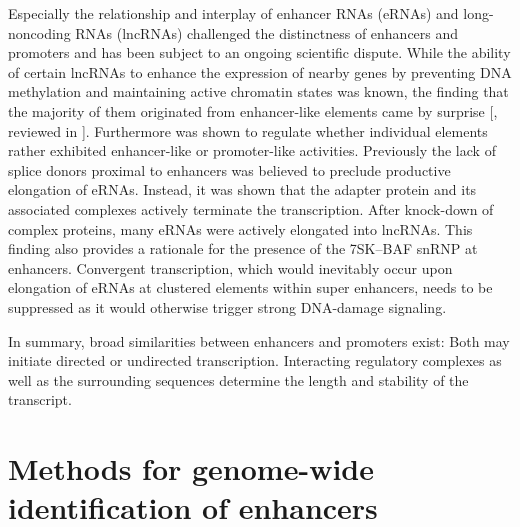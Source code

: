 Especially the relationship and interplay of enhancer RNAs (eRNAs) and long-noncoding RNAs (lncRNAs) challenged the distinctness of enhancers and promoters and has been subject to an ongoing scientific dispute\cite{Kowalczyk2012}. While the ability of certain lncRNAs to enhance the expression of nearby genes\cite{Oerom2010} by preventing DNA methylation\cite{DiRuscio2013} and maintaining active chromatin states\cite{Yang2014} was known, the finding that the majority of them originated from enhancer-like elements came by surprise [, reviewed in ]. Furthermore  was shown to regulate whether individual elements rather exhibited enhancer-like or promoter-like activities\cite{Outchkourov2013}. Previously the lack of splice donors\cite{Fong2001} proximal to enhancers was believed to preclude productive elongation of eRNAs\cite{Core2014}. Instead, it was shown that the adapter protein  and its associated complexes actively terminate the transcription. After knock-down of complex proteins, many eRNAs were actively elongated into lncRNAs\cite{Austenaa2015}. This finding also provides a rationale for the presence of the 7SK–BAF snRNP at enhancers. Convergent transcription, which would inevitably occur upon elongation of eRNAs at clustered elements within super enhancers, needs to be suppressed as it would otherwise trigger strong DNA-damage signaling\cite{Meng2014,Flynn2016}.

In summary, broad similarities between enhancers and promoters exist: Both may initiate directed or undirected transcription. Interacting regulatory complexes as well as the surrounding sequences determine the length and stability of the transcript\cite{Andersson2015,Andersson2015a,Haberle2018}. 

\section{Methods for genome-wide identification of enhancers}
\label{chap:i:enhancers:methods}

